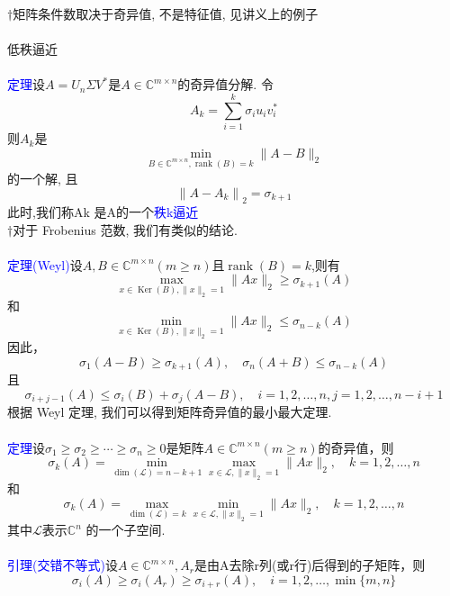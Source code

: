 \documentclass[12pt,a4paper]{article}
\begin{document}
$\dagger$矩阵条件数取决于奇异值, 不是特征值, 见讲义上的例子\\
\\
低秩逼近\\
\\
\textcolor{blue}{定理}设$A=U_{n} \Sigma V^{*}$是$A \in \mathbb{C}^{m \times n}$的奇异值分解. 令
$$
A_{k}=\sum_{i=1}^{k} \sigma_{i} u_{i} v_{i}^{*}
$$
则$A_{k}$是
\begin{equation}
\min _{B \in \mathbb{C}^{m \times n}, \operatorname{rank}(B)=k}\|A-B\|_{2}
\end{equation}
的一个解, 且
$$
\left\|A-A_{k}\right\|_{2}=\sigma_{k+1}
$$
此时,我们称Ak 是A的一个\textcolor{blue}{秩k逼近}\\
$\dagger$对于 Frobenius 范数, 我们有类似的结论.\\
\\
\textcolor{blue}{定理(Weyl)}设$A, B \in \mathbb{C}^{m \times n}(m \geq n)$且$\operatorname{rank}(B)=k$,则有
\begin{equation}
\max _{x \in \operatorname{Ker}(B),\|x\|_{2}=1}\|A x\|_{2} \geq \sigma_{k+1}(A)
\end{equation}
和
\begin{equation}
\min _{x \in \operatorname{Ker}(B),\|x\|_{2}=1}\|A x\|_{2} \leq \sigma_{n-k}(A)
\end{equation}
因此，
\begin{equation}
\sigma_{1}(A-B) \geq \sigma_{k+1}(A), \quad \sigma_{n}(A+B) \leq \sigma_{n-k}(A)
\end{equation}
且
\begin{equation}
\sigma_{i+j-1}(A) \leq \sigma_{i}(B)+\sigma_{j}(A-B), \quad i=1,2, \ldots, n, j=1,2, \ldots, n-i+1
\end{equation}
根据 Weyl 定理, 我们可以得到矩阵奇异值的最小最大定理.\\
\\
\textcolor{blue}{定理}设$\sigma_{1} \geq \sigma_{2} \geq \cdots \geq \sigma_{n} \geq 0$是矩阵$A \in \mathbb{C}^{m \times n}(m \geq n)$的奇异值，则
$$
\sigma_{k}(A)=\min _{\operatorname{dim}(\mathcal{L})=n-k+1} \max _{x \in \mathcal{L},\|x\|_{2}=1}\|A x\|_{2}, \quad k=1,2, \ldots, n
$$
和
$$
\sigma_{k}(A)=\max _{\operatorname{dim}(\mathcal{L})=k} \min _{x \in \mathcal{L},\|x\|_{2}=1}\|A x\|_{2}, \quad k=1,2, \ldots, n
$$
其中$\mathcal{L}$表示$\mathbb{C}^{n}$ 的一个子空间.\\
\\
\textcolor{blue}{引理(交错不等式)}设$A \in \mathbb{C}^{m \times n}, A_{r}$是由A去除r列(或r行)后得到的子矩阵，则
$$
\sigma_{i}(A) \geq \sigma_{i}\left(A_{r}\right) \geq \sigma_{i+r}(A), \quad i=1,2, \ldots, \min \{m, n\}
$$
\end{document}
